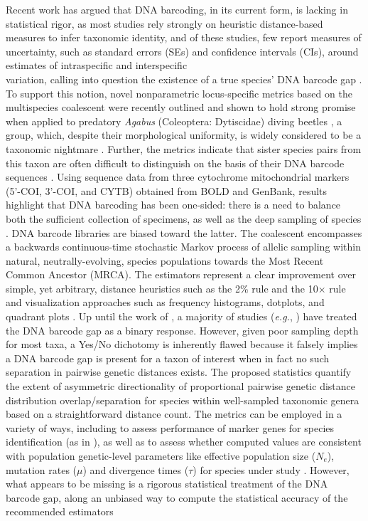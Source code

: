 \documentclass[12pt]{article}
\begin{document}
Recent work has argued that DNA barcoding, in its current form, is lacking in statistical rigor, as most studies rely strongly on heuristic distance-based measures to infer taxonomic identity, and of these studies, few report measures of uncertainty, such as standard errors (SEs) and confidence intervals (CIs), around estimates of intraspecific and interspecific \\ variation, calling into question the existence of a true species' DNA barcode gap \citep{phillips2022lack}. To support this notion, novel nonparametric locus-specific metrics based on the multispecies coalescent \citep{rannala2003bayes, yang2017bayesian} were recently outlined and shown to hold strong promise when applied to predatory \textit{Agabus} (Coleoptera: Dytiscidae) diving beetles \citep{phillips2024measure}, a group, which, despite their morphological uniformity, is widely considered to be a taxonomic nightmare \citep{bergsten2012effect}. Further, the metrics indicate that sister species pairs from this taxon are often difficult to distinguish on the basis of their DNA barcode sequences \citep{phillips2024measure}. Using sequence data from three cytochrome mitochondrial markers (5'-COI, 3'-COI, and CYTB) obtained from BOLD and GenBank, results highlight that DNA barcoding has been one-sided: there is a need to balance both the sufficient collection of specimens, as well as the deep sampling of species \citep{phillips2024measure}. DNA barcode libraries are biased toward the latter. The coalescent \citep{kingman1982coalescent} encompasses a backwards continuous-time stochastic Markov process of allelic sampling within natural, neutrally-evolving, species populations towards the Most Recent Common Ancestor (MRCA). The estimators represent a clear improvement over simple, yet arbitrary, distance heuristics such as the 2\% rule \citep{hebert2003biological} and the 10$\times$ rule \citep{hebert2004identification} and visualization approaches such as frequency histograms, dotplots, and quadrant plots \citep{phillips2024measure}. Up until the work of \cite{phillips2024measure}, a majority of studies (\textit{e.g.}, \citet{young2021macer}) have treated the DNA barcode gap as a binary response. However, given poor sampling depth for most taxa, a Yes/No dichotomy is inherently flawed because it falsely implies a DNA barcode gap is present for a taxon of interest when in fact no such separation in pairwise genetic distances exists. The proposed statistics quantify the extent of asymmetric directionality of proportional pairwise genetic distance distribution overlap/separation for species within well-sampled taxonomic genera based on a straightforward distance count. The metrics can be employed in a variety of ways, including to assess performance of marker genes for species identification (as in \citet{phillips2024measure}), as well as to assess whether computed values are consistent with population genetic-level parameters like effective population size ($N_e$), mutation rates ($\mu$) and divergence times ($\tau$) for species under study \citep{mather2019practical}. However, what appears to be missing is a rigorous statistical treatment of the DNA barcode gap, along an unbiased way to compute the statistical accuracy of the recommended estimators 
\end{document}
